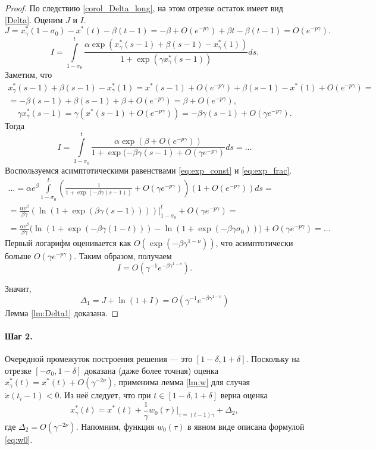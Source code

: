 \begin{proof}
По следствию \ref{corol_Delta_long}, на этом отрезке остаток имеет вид \eqref{Delta}. Оценим $J$ и $I$.
%
\[
J = x^*_{\gamma}(1 - \sigma_0) - x^*(t) - \beta (t - 1) = -\beta + O(e^{-p\gamma}) + \beta t - \beta(t - 1) = O(e^{-p\gamma}).
\]
%
\[
I = \int\limits_{1 - \sigma_0}^{t}\frac{\alpha\exp(x_{\gamma}^*(s-1)+\beta(s-1)-x_{\gamma}^*(1))}{1 + \exp(\gamma x_{\gamma}^*(s-1))} ds.
\]
Заметим, что
\begin{multline*}
x_{\gamma}^*(s-1)+\beta(s-1)-x_{\gamma}^*(1) = x^*(s - 1) + O(e^{-p\gamma}) + \beta(s - 1) - x^*(1) + O(e^{-p\gamma}) =\\= -\beta(s - 1) + \beta(s - 1) + \beta + O(e^{-p\gamma}) = \beta + O(e^{-p\gamma}),
\end{multline*}
\[
\gamma x^*_{\gamma}(s - 1) = \gamma (x^*(s - 1) + O(e^{-p\gamma})) = -\beta \gamma (s - 1) + O(\gamma e^{-p\gamma}).
\]
Тогда 
\[
I = \int\limits_{1 - \sigma_0}^{t}\frac{\alpha\exp(\beta + O(e^{-p\gamma}))}{1 + \exp(-\beta \gamma (s - 1) + O(\gamma e^{-p\gamma})} ds = \ldots
\]
Воспользуемся асимптотическими равенствами \eqref{eq:exp_const} и \eqref{eq:exp_frac}.
\begin{multline*}
\ldots = \alpha e^{\beta} \int\limits_{1 - \sigma_0}^{t}\left(\frac{1}{1 + \exp(-\beta \gamma (s - 1))} + O(\gamma e^{-p\gamma})\right)(1 + O(e^{-p\gamma})) ds = \\
= \frac{\alpha e^{\beta}}{\beta \gamma} \left(\ln(1 + \exp(\beta \gamma (s - 1)))\right)\bigg\vert_{1 - \sigma_0}^t + O(\gamma e^{-p\gamma}) = \\
= \frac{\alpha e^{\beta}}{\beta \gamma}  \big(\ln(1 + \exp(-\beta \gamma (1 - t))) - \ln(1 + \exp(-\beta \gamma \sigma_0)) \big) + O(\gamma e^{-p\gamma}) = \ldots 
\end{multline*}
%
Первый логарифм оценивается как $O(\exp(-\beta \gamma^{1 - \nu}))$, что асимптотически больше $O(\gamma e^{-p\gamma})$. Таким образом, получаем
\[
I = O(\gamma^{-1} e^{-\beta \gamma^{1 - \nu}}).
\]

Значит,
\begin{equation}
	\label{eq:Delta_step1}
	\Delta_1 = J + \ln(1 + I) = O(\gamma^{-1} e^{-\beta \gamma^{1 - \nu}})
\end{equation}
%
Лемма \ref{lm:Delta1} доказана.

\end{proof}

\paragraph{Шаг 2.} Очередной промежуток построения решения --- это $[1 - \delta, 1 + \delta]$. Поскольку на отрезке $[-\sigma_0, 1 - \delta]$ доказана (даже более точная) оценка $x^*_\gamma(t) = x^*(t) + O(\gamma^{-2\nu})$, применима лемма \ref{lm:w} для случая $\dot{x}(t_i - 1) < 0$. Из неё следует, что при $t \in [1 - \delta, 1 + \delta]$ верна оценка
\begin{equation}
	\label{eq:sol_2}
	x_{\gamma}^*(t) = x^*(t) + \frac{1}{\gamma} w_0(\tau)\bigg\vert_{\tau=(t - 1)\gamma} + \Delta_2,
\end{equation}
где $\Delta_2 = O(\gamma^{-2\nu})$. Напомним, функция $w_0(\tau)$ в явном виде описана формулой \eqref{eq:w0}.

